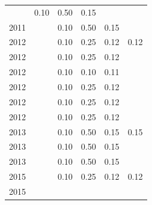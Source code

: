 \begin{table}[H]
\begin{tabular}{| l | c | c | c | c | c |}
          &
          0.10
          &
          0.50
          &
          0.15
          &
          \\
            2011
          &
          
          &
          0.10
          &
          0.50
          &
          0.15
          &
          \\
\hline
            2012
          &
          
          &
          0.10
          &
          0.25
          &
          0.12
          &
            {\color{red} 0.12}
          \\
            2012
          &
          
          &
          0.10
          &
          0.25
          &
          0.12
          &
          \\
            2012
          &
          
          &
          0.10
          &
          0.10
          &
          0.11
          &
          \\
            2012
          &
          
          &
          0.10
          &
          0.25
          &
          0.12
          &
          \\
            2012
          &
          
          &
          0.10
          &
          0.25
          &
          0.12
          &
          \\
            2012
          &
          
          &
          0.10
          &
          0.25
          &
          0.12
          &
          \\
\hline
            2013
          &
          
          &
          0.10
          &
          0.50
          &
          0.15
          &
            {\color{red} 0.15}
          \\
            2013
          &
          
          &
          0.10
          &
          0.50
          &
          0.15
          &
          \\
            2013
          &
          
          &
          0.10
          &
          0.50
          &
          0.15
          &
          \\
\hline
            2015
          &
          
          &
          0.10
          &
          0.25
          &
          0.12
          &
            {\color{red} 0.12}
          \\
            2015
          &
          

\end{tabular}
\end{table}
